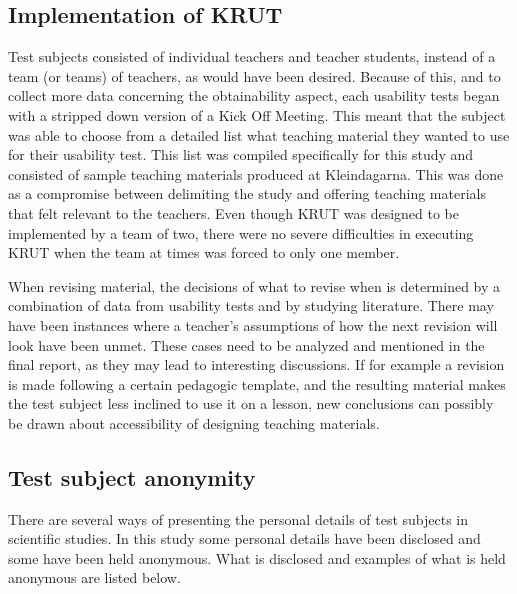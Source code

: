 \subsection{Implementation of KRUT}
Test subjects consisted of individual teachers and teacher students, instead of a team (or teams) of teachers, as would have been desired. Because of this, and to collect more data concerning the obtainability aspect, each usability tests began with a stripped down version of a Kick Off Meeting. This meant that the subject was able to choose from a detailed list what teaching material they wanted to use for their usability test. This list was compiled specifically for this study and consisted of sample teaching materials produced at  Kleindagarna. This was done as a compromise between delimiting the study and offering teaching materials that felt relevant to the teachers. Even though KRUT was designed to be implemented by a team of two, there were no severe difficulties in executing KRUT when the team at times was forced to only one member.

When revising material, the decisions of what to revise when is determined by a combination of data from usability tests and by studying literature. There may have been instances where a teacher’s assumptions of how the next revision will look have been unmet. These cases need to be analyzed and mentioned in the final report, as they may lead to interesting discussions. If for example a revision is made following a certain pedagogic template, and the resulting material makes the test subject less inclined to use it on a lesson, new conclusions can possibly be drawn about accessibility of designing teaching materials.


\subsection{Test subject anonymity}
There are several ways of presenting the personal details of test subjects in scientific studies. In this study some personal details have been disclosed and some have been held anonymous. What is disclosed and examples of what is held anonymous are listed below.

